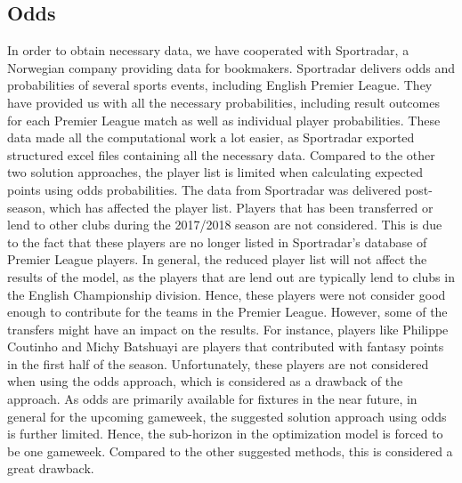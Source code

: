 \subsection{Odds}
In order to obtain necessary data, we have cooperated with Sportradar, a Norwegian company providing data for bookmakers. Sportradar delivers odds and probabilities of several sports events, including English Premier League. They have provided us with all the necessary probabilities, including result outcomes for each Premier League match as well as individual player probabilities. These data made all the computational work a lot easier, as Sportradar exported structured excel files containing all the necessary data. 
\newpar
Compared to the other two solution approaches, the player list is limited when calculating expected points using odds probabilities. The data from Sportradar was delivered post-season, which has affected the player list. Players that has been transferred or lend to other clubs during the 2017/2018 season are not considered. This is due to the fact that these players are no longer listed in Sportradar's database of Premier League players. In general, the reduced player list will not affect the results of the model, as the players that are lend out are typically lend to clubs in the English Championship division. Hence, these players were not consider good enough to contribute for the teams in the Premier League. However, some of the transfers might have an impact on the results. For instance, players like Philippe Coutinho and Michy Batshuayi are players that contributed with fantasy points in the first half of the season. Unfortunately, these players are not considered when using the odds approach, which is considered as a drawback of the approach.  
\newpar
As odds are primarily available for fixtures in the near future, in general for the upcoming gameweek, the suggested solution approach using odds is further limited. Hence, the sub-horizon in the optimization model is forced to be one gameweek. Compared to the other suggested methods, this is considered a great drawback.

